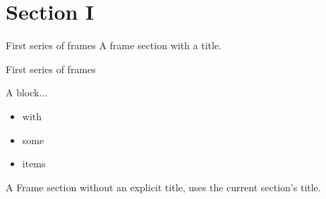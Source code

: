\documentclass{beamer}
\newenvironment{framesection}[1][\insertsection]{
  \def\insertframesection{#1}
}{
  \def\insertframesection{}
}
\begin{document}
\section*{Section I}

\begin{framesection}[First series of frames]
  \begin{frame}{\insertframesection}
    A frame section with a title.
  \end{frame}

  \begin{frame}{\insertframesection}
    \begin{block}{A block...}
        \begin{itemize}
          \item with 
          \item some
          \item items
        \end{itemize}
    \end{block}
  \end{frame}

\end{framesection}

\begin{framesection}
  \begin{frame}{\insertframesection}
    A Frame section without an explicit title, uses the current section's title.
  \end{frame}
\end{framesection}
\end{document}
